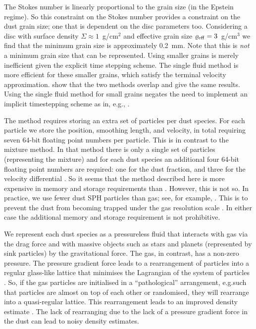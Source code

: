 \documentclass[fleqn,usenatbib]{mnras}
\begin{document}
The Stokes number is linearly proportional to the grain size (in the Epstein
regime). So this constraint on the Stokes number provides a constraint on the
dust grain size; one that is dependent on the disc parameters too. Considering a
disc with surface density \(\Sigma \approx 1\)~g/cm\({}^2\) and effective grain
size \(\varrho_{\rm eff} = 3\)~g/cm\({}^3\) we find that the minimum grain size
is approximately 0.2~mm. Note that this is \emph{not} a minimum grain size that
can be represented. Using smaller grains is merely inefficient given the
explicit time stepping scheme. The single fluid method is more efficient for
these smaller grains, which satisfy the terminal velocity approximation.
\citet{Cuello2019MNRAS.483.4114C} show that the two methods overlap and give the
same results. Using the single fluid method for small grains negates the need to
implement an implicit timestepping scheme as in, e.g.,
\citet{Loren-Aguilar2014MNRAS.443..927L, Loren-Aguilar2015MNRAS.454.4114L}.

The method requires storing an extra set of particles per dust species. For each
particle we store the position, smoothing length, and velocity, in total
requiring seven 64-bit floating point numbers per particle. This is in contrast
to the mixture method. In that method there is only a single set of particles
(representing the mixture) and for each dust species an additional four 64-bit
floating point numbers are required: one for the dust fraction, and three for
the velocity differential \citep{Hutchison2018MNRAS.476.2186H}. So it seems that
the method described here is more expensive in memory and storage requirements
than \citet{Hutchison2018MNRAS.476.2186H}. However, this is not so. In practice,
we use fewer dust SPH particles than gas; see, for example,
\citet{Dipierro2015MNRAS.453L..73D, Mentiplay2019MNRAS.484L.130M,
Calcino2019MNRAS.490.2579C}. This is to prevent the dust from becoming trapped
under the gas resolution scale \citep{Laibe2012MNRAS.420.2345L}. In either case
the additional memory and storage requirement is not prohibitive.

We represent each dust species as a pressureless fluid that interacts with gas
via the drag force and with massive objects such as stars and planets
(represented by sink particles) by the gravitational force. The gas, in
contrast, has a non-zero pressure. The pressure gradient force leads to a
rearrangement of particles into a regular glass-like lattice
\citep{Monaghan2005RPPh...68.1703M} that minimises the Lagrangian of the system
of particles \citep{Price2012JCoPh.231..759P}. So, if the gas particles are
initialised in a ``pathological'' arrangement, e.g.\@ such that particles are
almost on top of each other or randomised, they will rearrange into a
quasi-regular lattice. This rearrangement leads to an improved density estimate
\citep{Price2012JCoPh.231..759P}. The lack of rearranging due to the lack of a
pressure gradient force in the dust can lead to noisy density estimates.
\end{document}
